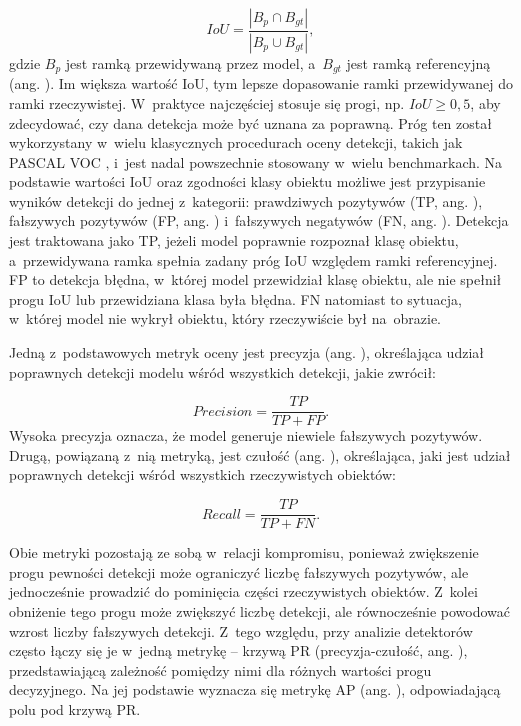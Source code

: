 \begin{equation}
    IoU = \frac{|B_p \cap B_{gt}|}{|B_p \cup B_{gt}|},
\end{equation}
gdzie $B_p$ jest ramką przewidywaną przez model, a~$B_{gt}$ jest ramką referencyjną (ang. ). Im większa wartość IoU, tym lepsze dopasowanie ramki przewidywanej do ramki rzeczywistej. W~praktyce najczęściej stosuje się progi, np. $IoU \geq 0,5$, aby zdecydować, czy dana detekcja może być uznana za poprawną. Próg ten został wykorzystany w~wielu klasycznych procedurach oceny detekcji, takich jak PASCAL VOC \cite{bib:PASCALVOCChallenge}, i~jest nadal powszechnie stosowany w~wielu benchmarkach. Na podstawie wartości IoU oraz zgodności klasy obiektu możliwe jest przypisanie wyników detekcji do jednej z~kategorii: prawdziwych pozytywów (TP, ang. ), fałszywych pozytywów (FP, ang. ) i~fałszywych negatywów (FN, ang. ). Detekcja jest traktowana jako TP, jeżeli model poprawnie rozpoznał klasę obiektu, a~przewidywana ramka spełnia zadany próg IoU względem ramki referencyjnej. FP to detekcja błędna, w~której model przewidział klasę obiektu, ale nie spełnił progu IoU lub przewidziana klasa była błędna. FN natomiast to sytuacja, w~której model nie wykrył obiektu, który rzeczywiście był na~obrazie.

Jedną z~podstawowych metryk oceny jest precyzja (ang. ), określająca udział poprawnych detekcji modelu wśród wszystkich detekcji, jakie zwrócił:

\begin{equation}
    Precision = \frac{TP}{TP + FP}.
\end{equation}
Wysoka precyzja oznacza, że model generuje niewiele fałszywych pozytywów. Drugą, powiązaną z~nią metryką, jest czułość (ang. ), określająca, jaki jest udział poprawnych detekcji wśród wszystkich rzeczywistych obiektów:

\begin{equation}
    Recall = \frac{TP}{TP + FN}.
\end{equation}

Obie metryki pozostają ze sobą w~relacji kompromisu, ponieważ zwiększenie progu pewności detekcji może ograniczyć liczbę fałszywych pozytywów, ale jednocześnie prowadzić do pominięcia części rzeczywistych obiektów. Z~kolei obniżenie tego progu może zwiększyć liczbę detekcji, ale równocześnie powodować wzrost liczby fałszywych detekcji. Z~tego względu, przy analizie detektorów często łączy się je w~jedną metrykę -- krzywą PR (precyzja-czułość, ang. ), przedstawiającą zależność pomiędzy nimi dla różnych wartości progu decyzyjnego. Na jej podstawie wyznacza się metrykę AP (ang. ), odpowiadającą polu pod krzywą PR.

